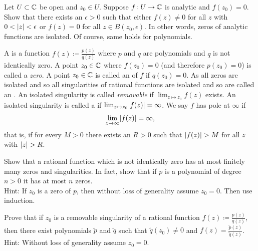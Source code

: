 \begin{exercise}
Let $U \subset {\mathbb{C}}$ be open and $z_0 \in U$.
Suppose $f \colon U \to {\mathbb{C}}$ is analytic and $f(z_0) = 0$.  Show that
there exists an $\epsilon > 0$ such that either
$f(z) \not= 0$ for all $z$ with $0 < \lvert {z} \rvert < \epsilon$
or $f(z) = 0$ for all $z \in B(z_0,\epsilon)$.
In other words, zeros of analytic functions are isolated.
Of course, same holds for polynomials.
\end{exercise}

\begin{exnote}
\pagebreak[1]
A \emph{} is a function
$f(z) \coloneqq \frac{p(z)}{q(z)}$
where $p$ and $q$ are polynomials and $q$ is not identically zero.
A point $z_0 \in {\mathbb{C}}$ where $f(z_0) = 0$ (and therefore $p(z_0) = 0$)
is called a \emph{zero}.
A point $z_0 \in {\mathbb{C}}$ is called an \emph{} of
$f$ if $q(z_0) = 0$.  As all zeros are isolated and so
all singularities of rational functions are isolated
and so are called
an \emph{}.
An isolated singularity is called
\emph{removable}
if $\lim_{z \mapsto z_0} f(z)$ exists.
An isolated singularity is called a \emph{} if 
$\lim_{z \mapsto z_0} \lvert {f(z)} \rvert = \infty$.
We say $f$ has pole at $\infty$ if
\begin{equation*}
\lim_{z \to \infty} \lvert {f(z)} \rvert = \infty ,
\end{equation*}
that is, if for every $M > 0$ there exists an $R > 0$ such that
$\lvert {f(z)} \rvert > M$ for all $z$ with $\lvert {z} \rvert > R$.
\end{exnote}

\begin{exercise}
Show that a rational function which is not identically
zero has at most finitely many zeros and
singularities.  In fact, show that if $p$ is a polynomial of 
degree $n > 0$ it has at most $n$ zeros.
\\
Hint: If $z_0$ is a zero of $p$, then without loss of generality assume $z_0 =
0$.  Then use induction.
\end{exercise}

\begin{exercise}
Prove that if $z_0$ is a removable singularity of a rational
function $f(z) \coloneqq \frac{p(z)}{q(z)}$, then there exist
polynomials $\widetilde{p}$ and $\widetilde{q}$ such that
$\widetilde{q}(z_0) \not= 0$ and $f(z) =
\frac{\widetilde{p}(z)}{\widetilde{q}(z)}$.
\\
Hint: Without loss of generality assume $z_0 = 0$.
\end{exercise}

